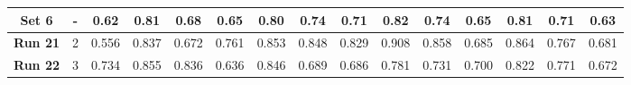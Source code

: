 \begin{table}[!ht]
{\begin{tabular}{|c|c|ccc|ccc|ccc|c|c|c|c|}
			
			\hline
			
			\textbf{Set 6} & - & \multicolumn{1}{c|}{0.62} & \multicolumn{1}{c|}{0.81} & 0.68 & \multicolumn{1}{c|}{0.65} & \multicolumn{1}{c|}{0.80} & 0.74 & \multicolumn{1}{c|}{0.71} & \multicolumn{1}{c|}{0.82} & 0.74 & 0.65 & 0.81 & 0.71 & 0.63 \\
			
			\hline
			\hline
			
			\textbf{Run 21} & 2 & \multicolumn{1}{c|}{0.556} & \multicolumn{1}{c|}{0.837} & 0.672 & \multicolumn{1}{c|}{0.761} & \multicolumn{1}{c|}{0.853} & 0.848 & \multicolumn{1}{c|}{0.829} & \multicolumn{1}{c|}{0.908} & 0.858 & 0.685 & 0.864 & 0.767 & 0.681 \\
			
			\textbf{Run 22} & 3 & \multicolumn{1}{c|}{0.734} & \multicolumn{1}{c|}{0.855} & 0.836 & \multicolumn{1}{c|}{0.636} & \multicolumn{1}{c|}{0.846} & 0.689 & \multicolumn{1}{c|}{0.686} & \multicolumn{1}{c|}{0.781} & 0.731 & 0.700 & 0.822 & 0.771 & 0.672 \\
			
			\hline
			
	\end{tabular}}
	\label{tab:Experiment1.3SevenPatchesNoRotation}
\end{table}

